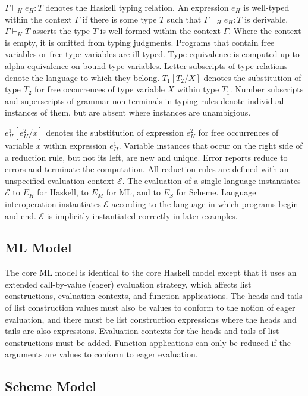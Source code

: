 $\Gamma\vdash_{H}e_{H}:T$ denotes the Haskell typing relation.  An expression $e_{H}$ is well-typed within the context $\Gamma$ if there is some type $T$ such that $\Gamma\vdash_{H}e_{H}:T$ is derivable.  $\Gamma\vdash_{H}T$ asserts the type $T$ is well-formed within the context $\Gamma$.  Where the context is empty, it is omitted from typing judgments.  Programs that contain free variables or free type variables are ill-typed.  Type equivalence is computed up to alpha-equivalence on bound type variables.  Letter subscripts of type relations denote the language to which they belong.  $T_{1}[T_{2}/X]$ denotes the substitution of type $T_{2}$ for free occurrences of type variable $X$ within type $T_{1}$.  Number subscripts and superscripts of grammar non-terminals in typing rules denote individual instances of them, but are absent where instances are unambigious.

$e_{H}^{1}[e_{H}^{2}/x]$ denotes the substitution of expression $e_{H}^{2}$ for free occurrences of variable $x$ within expression $e_{H}^{1}$.  Variable instances that occur on the right side of a reduction rule, but not its left, are new and unique.  Error reports reduce to errors and terminate the computation.  All reduction rules are defined with an unspecified evaluation context $\mathscr{E}$.  The evaluation of a single language instantiates $\mathscr{E}$ to $E_{H}$ for Haskell, to $E_{M}$ for ML, and to $E_{S}$ for Scheme.  Language interoperation instantiates $\mathscr{E}$ according to the language in which programs begin and end.  $\mathscr{E}$ is implicitly instantiated correctly in later examples.

\subsection{ML Model}

The core ML model is identical to the core Haskell model except that it uses an extended call-by-value (eager) evaluation strategy, which affects list constructions, evaluation contexts, and function applications.  The heads and tails of list construction values must also be values to conform to the notion of eager evaluation, and there must be list construction expressions where the heads and tails are also expressions.  Evaluation contexts for the heads and tails of list constructions must be added.  Function applications can only be reduced if the arguments are values to conform to eager evaluation.

\subsection{Scheme Model}

